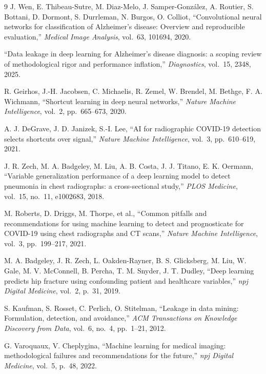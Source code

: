 \documentclass[3p,final,10pt]{elsarticle}
\begin{document}
\begin{thebibliography}{9}
J. Wen, E. Thibeau-Sutre, M. Diaz-Melo, J. Samper-Gonz\'{a}lez,
A. Routier, S. Bottani, D. Dormont, S. Durrleman, N. Burgos, O. Colliot,
``Convolutional neural networks for classification of Alzheimer's
disease: Overview and reproducible evaluation,'' \emph{Medical
Image Analysis}, vol.\ 63, 101694, 2020.

``Data leakage in deep learning for Alzheimer's disease diagnosis: a
scoping review of methodological rigor and performance inflation,''
\emph{Diagnostics}, vol.\ 15, 2348, 2025.

R. Geirhos, J.-H. Jacobsen, C. Michaelis, R. Zemel, W. Brendel, M. Bethge,
F. A. Wichmann, ``Shortcut learning in deep neural networks,'' \emph{Nature
Machine Intelligence}, vol.\ 2, pp.\ 665--673, 2020.

A. J. DeGrave, J. D. Janizek, S.-I. Lee, ``AI for radiographic COVID-19
detection selects shortcuts over signal,'' \emph{Nature Machine
Intelligence}, vol.\ 3, pp.\ 610--619, 2021.

J. R. Zech, M. A. Badgeley, M. Liu, A. B. Costa, J. J. Titano,
E. K. Oermann, ``Variable generalization performance of a deep learning
model to detect pneumonia in chest radiographs: a cross-sectional study,''
\emph{PLOS Medicine}, vol.\ 15, no.\ 11, e1002683, 2018.

M. Roberts, D. Driggs, M. Thorpe, et al., ``Common pitfalls and
recommendations for using machine learning to detect and prognosticate for
COVID-19 using chest radiographs and CT scans,'' \emph{Nature Machine
Intelligence}, vol.\ 3, pp.\ 199--217, 2021.

M. A. Badgeley, J. R. Zech, L. Oakden-Rayner, B. S. Glicksberg, M. Liu,
W. Gale, M. V. McConnell, B. Percha, T. M. Snyder, J. T. Dudley, ``Deep
learning predicts hip fracture using confounding patient and healthcare
variables,'' \emph{npj Digital Medicine}, vol.\ 2, p.\ 31, 2019.

S. Kaufman, S. Rosset, C. Perlich, O. Stitelman, ``Leakage in data mining:
Formulation, detection, and avoidance,'' \emph{ACM Transactions on
Knowledge Discovery from Data}, vol.\ 6, no.\ 4, pp.\ 1--21, 2012.

G. Varoquaux, V. Cheplygina, ``Machine learning for medical imaging:
methodological failures and recommendations for the future,'' \emph{npj
Digital Medicine}, vol.\ 5, p.\ 48, 2022.


\end{thebibliography}
\end{document}
